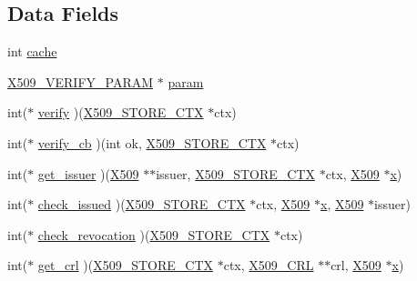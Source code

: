 \subsection*{Data Fields}
\begin{DoxyCompactItemize}
\item 
int \hyperlink{structx509__store__st_aaacdd23df699a342aac56566351a15e6}{cache}
\item 
\hyperlink{crypto_2x509_2x509__vfy_8h_a9b8209a7a29bafa279e1b5bc5f81cb23}{X509\+\_\+\+V\+E\+R\+I\+F\+Y\+\_\+\+P\+A\+R\+AM} $\ast$ \hyperlink{structx509__store__st_a93a023e30bcb76ab78c9bdb0db7a24f8}{param}
\item 
int($\ast$ \hyperlink{structx509__store__st_ac3a2bd38c545830a826a7d26031473d1}{verify} )(\hyperlink{crypto_2ossl__typ_8h_ae681945a2cf88d6337137dc0260a1545}{X509\+\_\+\+S\+T\+O\+R\+E\+\_\+\+C\+TX} $\ast$ctx)
\item 
int($\ast$ \hyperlink{structx509__store__st_a7a498a0e2b66a935922a642eeebfc183}{verify\+\_\+cb} )(int ok, \hyperlink{crypto_2ossl__typ_8h_ae681945a2cf88d6337137dc0260a1545}{X509\+\_\+\+S\+T\+O\+R\+E\+\_\+\+C\+TX} $\ast$ctx)
\item 
int($\ast$ \hyperlink{structx509__store__st_ac4f2db1b4c777ae1a8e1825848e6544c}{get\+\_\+issuer} )(\hyperlink{crypto_2ossl__typ_8h_a4f666bde6518f95deb3050c54b408416}{X509} $\ast$$\ast$issuer, \hyperlink{crypto_2ossl__typ_8h_ae681945a2cf88d6337137dc0260a1545}{X509\+\_\+\+S\+T\+O\+R\+E\+\_\+\+C\+TX} $\ast$ctx, \hyperlink{crypto_2ossl__typ_8h_a4f666bde6518f95deb3050c54b408416}{X509} $\ast$\hyperlink{include_2openssl_2pem_8h_a97dc7cf0c4554cbe9a4b58bfe9a749f5}{x})
\item 
int($\ast$ \hyperlink{structx509__store__st_a1d9c17fcd1eb6255bb12ff3e6cf2852b}{check\+\_\+issued} )(\hyperlink{crypto_2ossl__typ_8h_ae681945a2cf88d6337137dc0260a1545}{X509\+\_\+\+S\+T\+O\+R\+E\+\_\+\+C\+TX} $\ast$ctx, \hyperlink{crypto_2ossl__typ_8h_a4f666bde6518f95deb3050c54b408416}{X509} $\ast$\hyperlink{include_2openssl_2pem_8h_a97dc7cf0c4554cbe9a4b58bfe9a749f5}{x}, \hyperlink{crypto_2ossl__typ_8h_a4f666bde6518f95deb3050c54b408416}{X509} $\ast$issuer)
\item 
int($\ast$ \hyperlink{structx509__store__st_ac12df49e4e4808ab998230f834870cce}{check\+\_\+revocation} )(\hyperlink{crypto_2ossl__typ_8h_ae681945a2cf88d6337137dc0260a1545}{X509\+\_\+\+S\+T\+O\+R\+E\+\_\+\+C\+TX} $\ast$ctx)
\item 
int($\ast$ \hyperlink{structx509__store__st_af9ee5fc1ed05834912007fd603bf8b86}{get\+\_\+crl} )(\hyperlink{crypto_2ossl__typ_8h_ae681945a2cf88d6337137dc0260a1545}{X509\+\_\+\+S\+T\+O\+R\+E\+\_\+\+C\+TX} $\ast$ctx, \hyperlink{crypto_2ossl__typ_8h_ac8661d2485c2c8da5fd7dd26b846f4bf}{X509\+\_\+\+C\+RL} $\ast$$\ast$crl, \hyperlink{crypto_2ossl__typ_8h_a4f666bde6518f95deb3050c54b408416}{X509} $\ast$\hyperlink{include_2openssl_2pem_8h_a97dc7cf0c4554cbe9a4b58bfe9a749f5}{x})

\end{DoxyCompactItemize}
